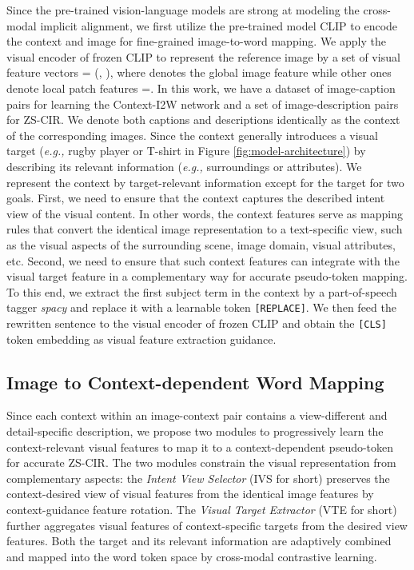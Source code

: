 \documentclass[letterpaper]{article} \usepackage{aaai24}  \usepackage{times}  \usepackage{helvet}  \usepackage{courier}  \usepackage[hyphens]{url}  \usepackage{graphicx} \urlstyle{rm} \def\UrlFont{\rm}  \usepackage{natbib}  \usepackage{caption} \frenchspacing  \setlength{\pdfpagewidth}{8.5in} \setlength{\pdfpageheight}{11in} \usepackage{algorithm}
\begin{document}
Since the pre-trained vision-language models are strong at modeling the cross-modal implicit alignment, we first utilize the pre-trained model CLIP to encode the context and image for fine-grained image-to-word mapping. We apply the visual encoder of frozen CLIP to represent the reference image  by a set of visual feature vectors   = (, ), where  denotes the global image feature  while other ones denote local patch features  =. In this work, we have a dataset of image-caption pairs for learning the Context-I2W network and a set of image-description pairs for ZS-CIR. We denote both captions and descriptions identically as the context of the corresponding images. Since the context generally introduces a visual target (\textit{e.g.,} rugby player or T-shirt in Figure \ref{fig:model-architecture}) by describing its relevant information  (\textit{e.g.,} surroundings or attributes). We represent the context by target-relevant information except for the target for two goals. First, we need to ensure that the context captures the described intent view of the visual content. In other words, the context features serve as mapping rules that convert the identical image representation to a text-specific view, such as the visual aspects of the surrounding scene, image domain, visual attributes, etc. Second, we need to ensure that such context features can integrate with the visual target feature in a complementary way for accurate pseudo-token mapping. To this end, we extract the first subject term in the context by a part-of-speech tagger \textit{spacy} \cite{honnibal2020spacy} and replace it with a learnable token \texttt{[REPLACE]}. We then feed the rewritten sentence to the visual encoder of frozen CLIP and obtain the \texttt{[CLS]} token embedding  as visual feature extraction guidance.   

\subsection{Image to Context-dependent Word Mapping}

Since each context  within an image-context pair contains a view-different and detail-specific description, we propose two modules to progressively learn the context-relevant visual features to map it to a context-dependent pseudo-token for accurate ZS-CIR. The two modules constrain the visual representation from complementary aspects: the \textit{Intent View Selector} (IVS for short) preserves the context-desired view of visual features from the identical image features by context-guidance feature rotation. The \textit{Visual Target Extractor}  (VTE for short) further aggregates visual features of context-specific targets from the desired view features. Both the target and its relevant information are adaptively combined and mapped into the word token space by cross-modal contrastive learning.   
\end{document}
